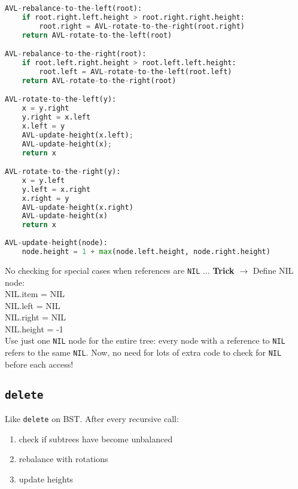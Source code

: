 \begin{lstlisting}[language=Python,mathescape]
AVL-rebalance-to-the-left(root):
	if root.right.left.height > root.right.right.height:
		root.right = AVL-rotate-to-the-right(root.right)
	return AVL-rotate-to-the-left(root)

AVL-rebalance-to-the-right(root):
	if root.left.right.height > root.left.left.height:
		root.left = AVL-rotate-to-the-left(root.left)
	return AVL-rotate-to-the-right(root)

AVL-rotate-to-the-left(y):
	x = y.right
	y.right = x.left
	x.left = y
	AVL-update-height(x.left);
	AVL-update-height(x);
	return x

AVL-rotate-to-the-right(y):
	x = y.left
	y.left = x.right
	x.right = y
	AVL-update-height(x.right)
	AVL-update-height(x)
	return x
	
AVL-update-height(node):
	node.height = 1 + max(node.left.height, node.right.height)
\end{lstlisting}

\noindent No checking for special cases when references are \texttt{NIL} $\ldots$
\textbf{Trick} $\rightarrow$ Define NIL node: \\
\indent NIL.item = NIL \\
\indent NIL.left = NIL \\
\indent NIL.right = NIL \\
\indent NIL.height = -1 \\
Use just one \texttt{NIL} node for the entire tree: every node with a reference to \texttt{NIL} refers to the same \texttt{NIL}. Now, no need for lots of extra code to check for \texttt{NIL} before each access!

\subsection*{\texttt{delete}}

\noindent Like \texttt{delete} on BST. After every recursive call:
\begin{enumerate}[label={(\arabic*)}]
	\item check if subtrees have become unbalanced
	\item rebalance with rotations
	\item update heights
\end{enumerate}

